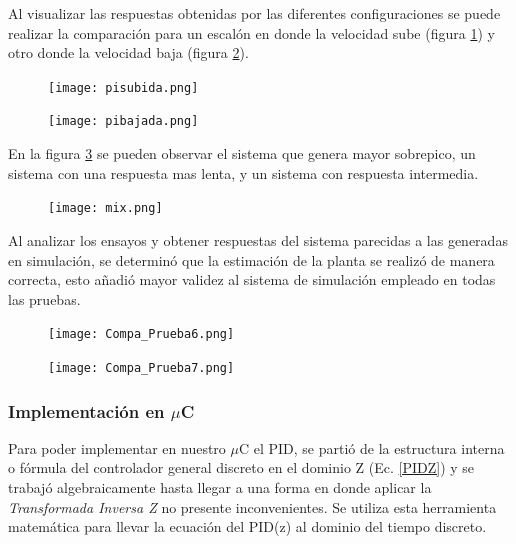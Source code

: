     Al visualizar las respuestas obtenidas por las diferentes configuraciones se puede realizar la comparación para un escalón en donde la velocidad sube (figura \ref{fig:pisubuda}) y otro donde la velocidad baja (figura \ref{fig:pibajada}).
    
    \begin{figure}[H]
    	\centering
    	\texttt{[image: pisubida.png]}
    	\label{fig:pisubuda}
    \end{figure}
    
    \begin{figure}[H]
    	\centering
    	\texttt{[image: pibajada.png]}
    	\label{fig:pibajada}
    \end{figure}
    
    
    En la figura \ref{fig:mix} se pueden observar el sistema que genera mayor sobrepico, un sistema con una respuesta mas lenta, y un sistema con respuesta intermedia. 
    \begin{figure}[H]
    	\centering
    	\texttt{[image: mix.png]}
    	\label{fig:mix}
    \end{figure}

	Al analizar los ensayos y obtener respuestas del sistema parecidas a las generadas en simulación, se determinó que la estimación de la planta se realizó de manera correcta, esto añadió mayor validez al sistema de simulación empleado en todas las pruebas. 
	
	\begin{figure}[H]
		\centering
		\texttt{[image: Compa\_Prueba6.png]}
		\label{fig:Prueba_6}
	\end{figure}   
\begin{figure}[H]
	\centering
	\texttt{[image: Compa\_Prueba7.png]}
	\label{fig:Prueba_7}
\end{figure}   
    \subsubsection{Implementación en $\mu$C}
    
    Para poder implementar en nuestro $\mu$C  el PID, se partió de la estructura interna o fórmula del controlador general discreto en el dominio Z (Ec. \ref{PIDZ}) y se trabajó algebraicamente hasta llegar a una forma en donde aplicar la \textit{Transformada Inversa Z} no presente inconvenientes. Se utiliza esta herramienta matemática para llevar la ecuación del PID(z) al dominio del tiempo discreto.
    
